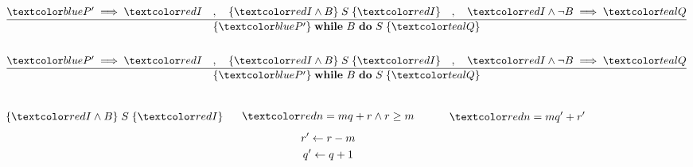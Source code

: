
\begin{frame}
  \[
    \dfrac{\blue{P'} \implies \red{I} \quad,\quad \{\red{I} \land B\}\; S\; \{\red{I}\}
    \quad,\quad \red{I} \land \lnot B \implies \teal{Q}}
    {\{\blue{P'}\}\; \textbf{while}\ B\ \textbf{do}\ S\; \{\teal{Q}\}}
  \]
  
  \begin{columns}
      
  \end{columns}
\end{frame}

\begin{frame}
  \[
    \dfrac{\blue{P'} \implies \red{I} \quad,\quad \{\red{I} \land B\}\; S\; \{\red{I}\}
    \quad,\quad \red{I} \land \lnot B \implies \teal{Q}}
    {\{\blue{P'}\}\; \textbf{while}\ B\ \textbf{do}\ S\; \{\teal{Q}\}}
  \]
  
  \begin{columns}
      
      \[
        \{\red{I} \land B\}\; S\; \{\red{I}\}
      \]
        
      \pause
      \vspace{-0.30cm}
      \begin{gather}
        \red{n = mq + r} \land r \ge m \\[5pt]
        r' \gets r - m \\
        q' \gets q + 1
      \end{gather}
      \hrule
      \begin{gather}
        \red{n = mq' + r'}
      \end{gather}
  \end{columns}
\end{frame}

